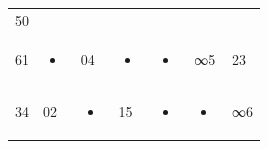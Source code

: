 \documentclass[
  11pt,
  a4paper]{book}
\begin{document}
\begin{longtable}[]{@{}lllllll@{}}
\begin{minipage}[t]{0.06\columnwidth}
50\strut
\end{minipage}\tabularnewline
\begin{minipage}[t]{0.06\columnwidth}\raggedright
61\strut
\end{minipage} & \begin{minipage}[t]{0.06\columnwidth}\raggedright
\begin{itemize}
\item
\end{itemize}\strut
\end{minipage} & \begin{minipage}[t]{0.06\columnwidth}\raggedright
04\strut
\end{minipage} & \begin{minipage}[t]{0.06\columnwidth}\raggedright
\begin{itemize}
\item
\end{itemize}\strut
\end{minipage} & \begin{minipage}[t]{0.06\columnwidth}\raggedright
\begin{itemize}
\item
\end{itemize}\strut
\end{minipage} & \begin{minipage}[t]{0.06\columnwidth}\raggedright
∞5\strut
\end{minipage} & \begin{minipage}[t]{0.06\columnwidth}\raggedright
23\strut
\end{minipage}\tabularnewline
\begin{minipage}[t]{0.06\columnwidth}\raggedright
34\strut
\end{minipage} & \begin{minipage}[t]{0.06\columnwidth}\raggedright
02\strut
\end{minipage} & \begin{minipage}[t]{0.06\columnwidth}\raggedright
\begin{itemize}
\item
\end{itemize}\strut
\end{minipage} & \begin{minipage}[t]{0.06\columnwidth}\raggedright
15\strut
\end{minipage} & \begin{minipage}[t]{0.06\columnwidth}\raggedright
\begin{itemize}
\item
\end{itemize}\strut
\end{minipage} & \begin{minipage}[t]{0.06\columnwidth}\raggedright
\begin{itemize}
\item
\end{itemize}\strut
\end{minipage} & \begin{minipage}[t]{0.06\columnwidth}\raggedright
∞6\strut
\end{minipage}\tabularnewline
\bottomrule
\end{longtable}
\end{document}
